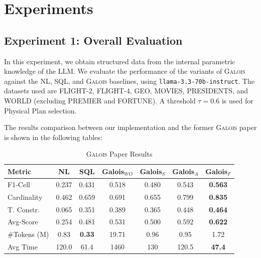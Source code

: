 \section{Experiments}

\subsection{Experiment 1: Overall Evaluation}
In this experiment, we obtain structured data from the internal parametric knowledge of the LLM. We evaluate the performance of the variants of \textsc{Galois} against the NL, SQL, and \textsc{Galois} baselines, using \texttt{llama-3.3-70b-instruct}. The datasets used are FLIGHT-2, FLIGHT-4, GEO, MOVIES, PRESIDENTS, and WORLD (excluding PREMIER and FORTUNE). A threshold $\tau = 0.6$ is used for Physical Plan selection.

The results comparison between our implementation and the former \textsc{Galois} paper is shown in the following tables:

\begin{table}[H]
    \centering
    \caption{\textsc{Galois} Paper Results}
    \label{tab:galois_paper_exp1}
    \begin{tabular}{lcccccc}
        \toprule
        \textbf{Metric} & \textbf{NL} & \textbf{SQL} & \textbf{Galois$_{WO}$} & \textbf{Galois$_S$} & \textbf{Galois$_A$} & \textbf{Galois$_F$} \\
        \midrule
        F1-Cell & 0.237 & 0.431 & 0.518 & 0.480 & 0.543 & \textbf{0.563} \\
        Cardinality & 0.462 & 0.659 & 0.691 & 0.655 & 0.799 & \textbf{0.835} \\
        T. Constr. & 0.065 & 0.351 & 0.389 & 0.365 & 0.448 & \textbf{0.464} \\
        Avg-Score & 0.254 & 0.481 & 0.531 & 0.500 & 0.592 & \textbf{0.622} \\
        \#Tokens (M) & 0.83 & \textbf{0.33} & 19.71 & 0.96 & 0.95 & 1.72 \\
        Avg Time & 120.0 & 61.4 & 1460 & 130 & 120.5 & \textbf{47.4} \\
        \bottomrule
    \end{tabular}
\end{table}

